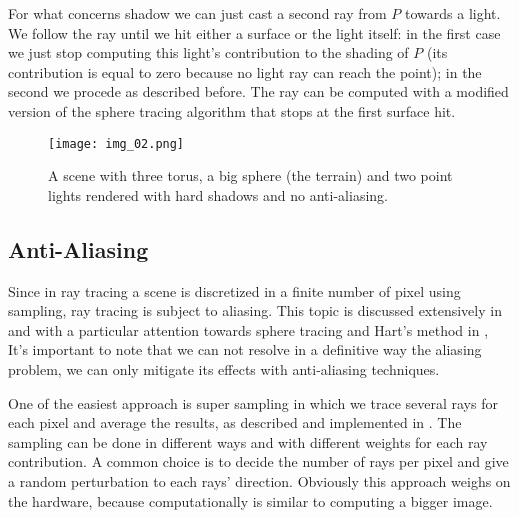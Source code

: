 For what concerns shadow we can just cast a second ray from $P$ towards a light.
We follow the ray until we hit either a surface or the light itself:
in the first case we just stop computing this light's contribution to the shading of $P$ (its contribution is equal to zero because no light ray can reach the point);
in the second we procede as described before.
The ray can be computed with a modified version of the sphere tracing algorithm that stops at the first surface hit.
\begin{figure}[!htb]
  \texttt{[image: img\_02.png]}
  \caption{A scene with three torus, a big sphere (the terrain) and two point lights rendered with hard shadows and no anti-aliasing.}
  \label{fig:toruses}
\end{figure}

\subsection{Anti-Aliasing}
Since in ray tracing a scene is discretized in a finite number of pixel using sampling, ray tracing is subject to aliasing.
This topic is discussed extensively in \cite{rt_groundup} and with a particular attention towards sphere tracing and Hart's method in \cite{hart1996, scratch_sdf}, 
It's important to note that we can not resolve in a definitive way the aliasing problem, we can only mitigate its effects with anti-aliasing techniques.

One of the easiest approach is super sampling in which we trace several rays for each pixel and average the results, as described and implemented in \cite{rt_one_weekend}.
The sampling can be done in different ways and with different weights for each ray contribution.
A common choice is to decide the number of rays per pixel and give a random perturbation to each rays' direction.
Obviously this approach weighs on the hardware, because computationally is similar to computing a bigger image.

